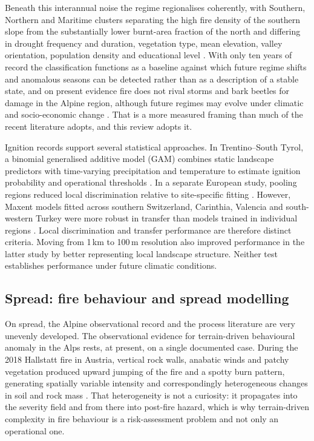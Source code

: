 \documentclass[11pt,a4paper]{article}
\begin{document}
Beneath this interannual noise the regime regionalises coherently, with Southern, Northern and Maritime clusters separating the high fire density of the southern slope from the substantially lower burnt-area fraction of the north and differing in drought frequency and duration, vegetation type, mean elevation, valley orientation, population density and educational level \citep{conedera_characterizing_2018}. With only ten years of record the classification functions as a baseline against which future regime shifts and anomalous seasons can be detected rather than as a description of a stable state, and on present evidence fire does not rival storms and bark beetles for damage in the Alpine region, although future regimes may evolve under climatic and socio-economic change \citep{conedera_characterizing_2018}. That is a more measured framing than much of the recent literature adopts, and this review adopts it.

Ignition records support several statistical approaches. In Trentino--South Tyrol, a binomial generalised additive model (GAM) combines static landscape predictors with time-varying precipitation and temperature to estimate ignition probability and operational thresholds \citep{moreno_1_nodate}. In a separate European study, pooling regions reduced local discrimination relative to site-specific fitting \citep{gelabert_assessing_2025}. However, Maxent models fitted across southern Switzerland, Carinthia, Valencia and south-western Turkey were more robust in transfer than models trained in individual regions \citep{bekar_crossregional_2020}. Local discrimination and transfer performance are therefore distinct criteria. Moving from 1\,km to 100\,m resolution also improved performance in the latter study by better representing local landscape structure. Neither test establishes performance under future climatic conditions.

\subsection{Spread: fire behaviour and spread modelling}

On spread, the Alpine observational record and the process literature are very unevenly developed. The observational evidence for terrain-driven behavioural anomaly in the Alps rests, at present, on a single documented case. During the 2018 Hallstatt fire in Austria, vertical rock walls, anabatic winds and patchy vegetation produced upward jumping of the fire and a spotty burn pattern, generating spatially variable intensity and correspondingly heterogeneous changes in soil and rock mass \citep{melzner_brief_2019}. That heterogeneity is not a curiosity: it propagates into the severity field and from there into post-fire hazard, which is why terrain-driven complexity in fire behaviour is a risk-assessment problem and not only an operational one.
\end{document}
